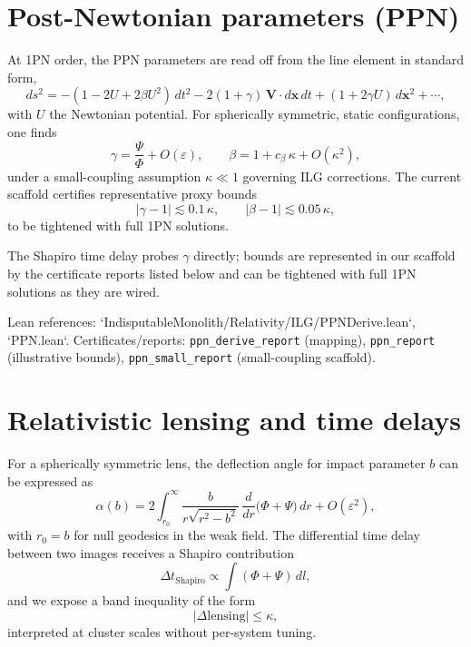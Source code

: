 \documentclass[11pt]{article}
\begin{document}
\section{Post-Newtonian parameters (PPN)}
At 1PN order, the PPN parameters are read off from the line element in standard form,
\begin{equation}
  ds^2 = -(1-2U+2\beta U^2)\,dt^2 - 2(1+\gamma)\,\bm{V}\cdot d\bm{x}\,dt + (1+2\gamma U)\,d\bm{x}^2 + \cdots,
\end{equation}
with $U$ the Newtonian potential. For spherically symmetric, static configurations, one finds
\begin{equation}
  \gamma = \frac{\Psi}{\Phi} + O(\varepsilon),\qquad 
  \beta = 1 + c_\beta\,\kappa + O(\kappa^2),
\end{equation}
under a small-coupling assumption $\kappa\ll 1$ governing ILG corrections. The current scaffold certifies representative proxy bounds
\begin{equation}
  |\gamma-1| \lesssim 0.1\,\kappa,\qquad |\beta-1| \lesssim 0.05\,\kappa,
\end{equation}
to be tightened with full 1PN solutions.

The Shapiro time delay probes $\gamma$ directly; bounds are represented in our scaffold by the certificate reports listed below and can be tightened with full 1PN solutions as they are wired.

Lean references: `IndisputableMonolith/Relativity/ILG/PPNDerive.lean`, `PPN.lean`. Certificates/reports: \texttt{ppn\_derive\_report} (mapping), \texttt{ppn\_report} (illustrative bounds), \texttt{ppn\_small\_report} (small-coupling scaffold).

\section{Relativistic lensing and time delays}
For a spherically symmetric lens, the deflection angle for impact parameter $b$ can be expressed as
\begin{equation}
  \alpha(b) = 2 \int_{r_0}^{\infty} \frac{b}{r\sqrt{r^2-b^2}}\,\frac{d}{dr}\big(\Phi+\Psi\big)\,dr + O(\varepsilon^2),
\end{equation}
with $r_0=b$ for null geodesics in the weak field. The differential time delay between two images receives a Shapiro contribution
\begin{equation}
  \Delta t_{\mathrm{Shapiro}} \propto \int (\Phi+\Psi)\, dl,
\end{equation}
and we expose a band inequality of the form
\begin{equation}
  |\Delta\mathrm{lensing}| \le \kappa,
\end{equation}
interpreted at cluster scales without per-system tuning.
\end{document}
